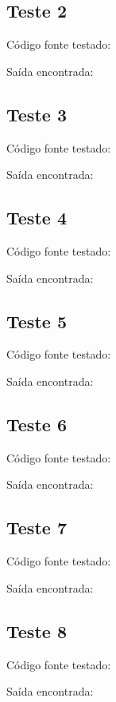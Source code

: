 \documentclass[11pt]{article}
\begin{document}
	
	\subsection{Teste 2}
		
		Código fonte testado:
		
			
		Saída encontrada:
		


	\subsection{Teste 3}
	
		Código fonte testado:
		
			
		Saída encontrada:
		


	\subsection{Teste 4}
	
		Código fonte testado:
		
			
		Saída encontrada:
		
		
	
	\subsection{Teste 5}
	
		Código fonte testado:
		
			
		Saída encontrada:
		

	\newpage
	\subsection{Teste 6}
	
		Código fonte testado:
		
			
		Saída encontrada:
		

	\newpage
	\subsection{Teste 7}
	
		Código fonte testado:
		
			
		Saída encontrada:
		


	\subsection{Teste 8}
	
		Código fonte testado:
		
		
		Saída encontrada:
		
\end{document}
